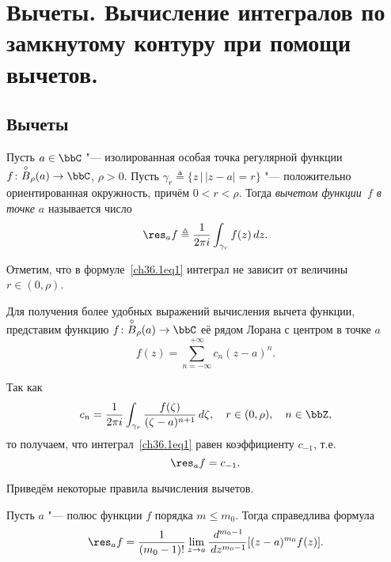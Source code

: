 \chapter{Вычеты. Вычисление интегралов по замкнутому контуру при помощи вычетов.}

\section{Вычеты}

\begin{defn}
Пусть $a \in \bbC$ "--- изолированная особая точка регулярной функции~$f\colon \overset{\circ}{B}_\rho(a) \to \bbC$, $\rho > 0$. Пусть $\gamma_r \triangleq \{ z \,\big|\, |z - a| = r\}$ "--- положительно ориентированная окружность, причём $0 < r < \rho$. Тогда \textit{вычетом функции~$f$ в точке $a$} называется число
\begin{equation} \label{ch36.1eq1}
\res_{a} f \triangleq \frac{1}{2\pi i} \int_{\gamma_r} f(z) \,dz.
\end{equation}
\end{defn}

Отметим, что в формуле~\eqref{ch36.1eq1} интеграл не зависит от величины~$r\in (0, \rho)$.

Для получения более удобных выражений вычисления вычета функции, представим функцию $f\colon \overset{\circ}{B}_\rho(a) \to \bbC$ её рядом Лорана с центром в точке $a$
\begin{equation} \label{ch36.1eq2}
f(z) = \sum_{n = -\infty}^{+\infty} c_n (z - a)^n.
\end{equation}

Так как
$$
c_n = \frac{1}{2\pi i} \int_{\gamma_r} \frac{f(\zeta)}{(\zeta - a)^{n + 1}} \,d\zeta, \quad r \in (0, \rho), \quad n \in \bbZ,
$$
то получаем, что интеграл~\eqref{ch36.1eq1} равен коэффициенту $c_{-1}$, т.е.
\begin{equation} \label{ch36.1eq3}
\res_{a} f = c_{-1}.
\end{equation}

Приведём некоторые правила вычисления вычетов.

\begin{lemm} \label{ch36.1lemm1}
Пусть $a$ "--- полюс функции $f$ порядка $m \le m_0$. Тогда справедлива формула
\begin{equation} \label{ch36.1eq4}
\res_{a} f = \frac{1}{(m_0 - 1)!} \lim_{z \to a} \frac{\,d^{m_0 -1}}{\,dz^{m_0 - 1}} [(z - a)^{m_0} f(z)].
\end{equation}
\end{lemm}

